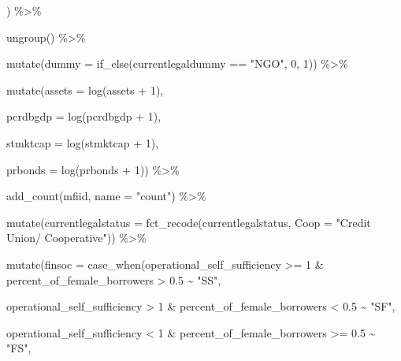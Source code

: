 \documentclass[a4paper,nobind]{templates/ociamthesis}
\newenvironment{Shaded}{\begin{snugshade}}{\end{snugshade}}
\newcommand{\AttributeTok}[1]{\textcolor[rgb]{0.77,0.63,0.00}{#1}}
\newcommand{\DecValTok}[1]{\textcolor[rgb]{0.00,0.00,0.81}{#1}}
\newcommand{\FloatTok}[1]{\textcolor[rgb]{0.00,0.00,0.81}{#1}}
\newcommand{\FunctionTok}[1]{\textcolor[rgb]{0.00,0.00,0.00}{#1}}
\newcommand{\NormalTok}[1]{#1}
\newcommand{\SpecialCharTok}[1]{\textcolor[rgb]{0.00,0.00,0.00}{#1}}
\newcommand{\StringTok}[1]{\textcolor[rgb]{0.31,0.60,0.02}{#1}}
\renewenvironment{Shaded}
{
  \vspace{10pt}%
  \begin{snugshade}%
}{%
  \end{snugshade}%
  \vspace{8pt}%
}
\begin{document}
\begin{Shaded}
\begin{Highlighting}[]
\NormalTok{         ) }\SpecialCharTok{\%\textgreater{}\%} 
  
  \FunctionTok{ungroup}\NormalTok{() }\SpecialCharTok{\%\textgreater{}\%} 
  
  \FunctionTok{mutate}\NormalTok{(}\AttributeTok{dummy =} \FunctionTok{if\_else}\NormalTok{(currentlegaldummy }\SpecialCharTok{==} \StringTok{"NGO"}\NormalTok{, }\DecValTok{0}\NormalTok{, }\DecValTok{1}\NormalTok{)) }\SpecialCharTok{\%\textgreater{}\%} 
  
  \FunctionTok{mutate}\NormalTok{(}\AttributeTok{assets =} \FunctionTok{log}\NormalTok{(assets }\SpecialCharTok{+} \DecValTok{1}\NormalTok{),}
         
         \AttributeTok{pcrdbgdp =} \FunctionTok{log}\NormalTok{(pcrdbgdp }\SpecialCharTok{+} \DecValTok{1}\NormalTok{),}
         
         \AttributeTok{stmktcap =} \FunctionTok{log}\NormalTok{(stmktcap }\SpecialCharTok{+} \DecValTok{1}\NormalTok{),}
         
         \AttributeTok{prbonds =} \FunctionTok{log}\NormalTok{(prbonds }\SpecialCharTok{+} \DecValTok{1}\NormalTok{)) }\SpecialCharTok{\%\textgreater{}\%} 
  
  \FunctionTok{add\_count}\NormalTok{(mfiid, }\AttributeTok{name =} \StringTok{"count"}\NormalTok{) }\SpecialCharTok{\%\textgreater{}\%} 
  
  \FunctionTok{mutate}\NormalTok{(}\AttributeTok{currentlegalstatus =} \FunctionTok{fct\_recode}\NormalTok{(currentlegalstatus, }\AttributeTok{Coop =} \StringTok{"Credit Union/ Cooperative"}\NormalTok{)) }\SpecialCharTok{\%\textgreater{}\%} 
  
  \FunctionTok{mutate}\NormalTok{(}\AttributeTok{finsoc =} \FunctionTok{case\_when}\NormalTok{(operational\_self\_sufficiency }\SpecialCharTok{\textgreater{}=} \DecValTok{1} \SpecialCharTok{\&}\NormalTok{ percent\_of\_female\_borrowers }\SpecialCharTok{\textgreater{}} \FloatTok{0.5} \SpecialCharTok{\textasciitilde{}} \StringTok{"SS"}\NormalTok{,}
                            
\NormalTok{                            operational\_self\_sufficiency }\SpecialCharTok{\textgreater{}} \DecValTok{1} \SpecialCharTok{\&}\NormalTok{ percent\_of\_female\_borrowers }\SpecialCharTok{\textless{}} \FloatTok{0.5} \SpecialCharTok{\textasciitilde{}} \StringTok{"SF"}\NormalTok{, }
                            
\NormalTok{                            operational\_self\_sufficiency }\SpecialCharTok{\textless{}} \DecValTok{1} \SpecialCharTok{\&}\NormalTok{ percent\_of\_female\_borrowers }\SpecialCharTok{\textgreater{}=} \FloatTok{0.5} \SpecialCharTok{\textasciitilde{}} \StringTok{"FS"}\NormalTok{,}
                            

\end{Highlighting}
\end{Shaded}
\end{document}

